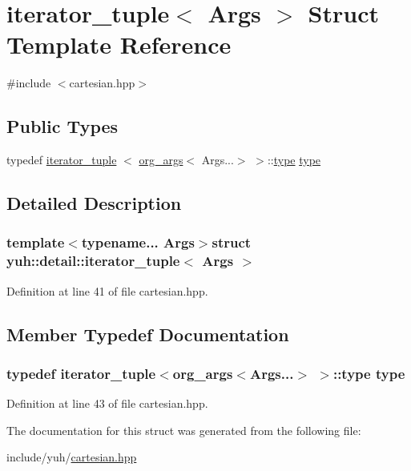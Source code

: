 \hypertarget{structyuh_1_1detail_1_1iterator__tuple}{\section{iterator\-\_\-tuple$<$ \-Args $>$ \-Struct \-Template \-Reference}
\label{dc/d95/structyuh_1_1detail_1_1iterator__tuple}
}


{\ttfamily \#include $<$cartesian.\-hpp$>$}

\subsection*{\-Public \-Types}
\begin{DoxyCompactItemize}
\item 
typedef \hyperlink{structyuh_1_1detail_1_1iterator__tuple}{iterator\-\_\-tuple}\*
$<$ \hyperlink{structyuh_1_1detail_1_1org__args}{org\-\_\-args}$<$ \-Args...$>$ $>$\-::\hyperlink{structyuh_1_1detail_1_1iterator__tuple_a187957bce48f600bdefd21695e55bde1}{type} \hyperlink{structyuh_1_1detail_1_1iterator__tuple_a187957bce48f600bdefd21695e55bde1}{type}
\end{DoxyCompactItemize}


\subsection{\-Detailed \-Description}
\subsubsection*{template$<$typename... \-Args$>$struct yuh\-::detail\-::iterator\-\_\-tuple$<$ Args $>$}



\-Definition at line 41 of file cartesian.\-hpp.



\subsection{\-Member \-Typedef \-Documentation}
\hypertarget{structyuh_1_1detail_1_1iterator__tuple_a187957bce48f600bdefd21695e55bde1}{
\subsubsection[{type}]{\setlength{\rightskip}{0pt plus 5cm}typedef {\bf iterator\-\_\-tuple}$<${\bf org\-\_\-args}$<$\-Args...$>$ $>$\-::{\bf type} {\bf type}}}\label{dc/d95/structyuh_1_1detail_1_1iterator__tuple_a187957bce48f600bdefd21695e55bde1}


\-Definition at line 43 of file cartesian.\-hpp.



\-The documentation for this struct was generated from the following file\-:\begin{DoxyCompactItemize}
\item 
include/yuh/\hyperlink{cartesian_8hpp}{cartesian.\-hpp}\end{DoxyCompactItemize}
